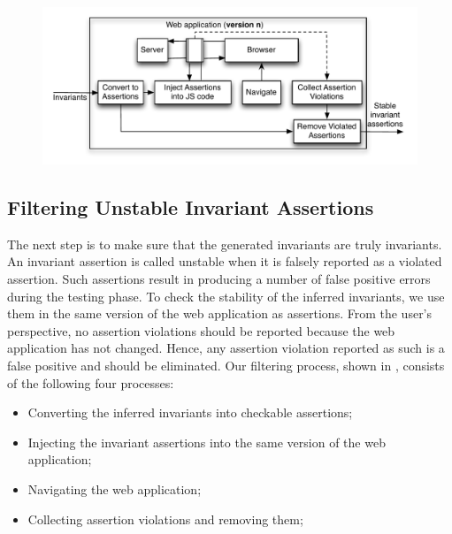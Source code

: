 \begin{figure}[t]
\centering
\includegraphics[width=0.9\hsize]{fig/filter-test}
\label{Fig:filtering}
\end{figure}


\subsection{Filtering Unstable Invariant Assertions}
\label{Sec:filtering}
The next step is to make sure that the generated invariants are truly invariants. 
An invariant assertion is called unstable when it is falsely reported as a violated assertion. Such assertions result in producing a number of false positive errors 
during the testing phase. 
To check the stability of the inferred invariants, we use them in the same version of the web application as assertions. From the user's perspective, no assertion violations should be reported because the web application has not changed. Hence, any assertion violation reported as such is a false positive and should be eliminated. Our filtering process, shown in , consists of the following four processes:

\begin{itemize}
\item Converting the inferred invariants into checkable assertions;
\item Injecting the invariant assertions into the same version of the web application;
\item Navigating the web application;
\item Collecting assertion violations and removing them;
\end{itemize}



